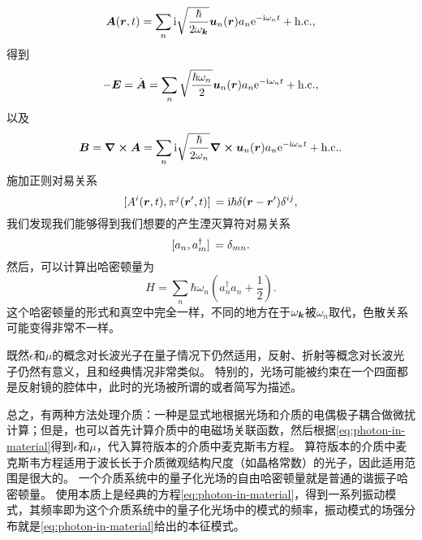 \begin{equation}
    \vb*{A}(\vb*{r}, t) = \sum_n \mathrm{i} \sqrt{\frac{\hbar}{2\omega_{\vb*{k}}}} \vb*{u}_n(\vb*{r}) a_n \mathrm{e}^{- \mathrm{i} \omega_n t} + \text{h.c.},
\end{equation}
得到
\begin{equation}
    - \vb*{E} = \dot{\vb*{A}} = \sum_n \sqrt{\frac{\hbar \omega_n}{2}} \vb*{u}_n(\vb*{r}) a_n \mathrm{e}^{-\mathrm{i} \omega_n t} + \text{h.c.},
\end{equation}
以及
\begin{equation}
    \vb*{B} = \curl{\vb*{A}} = \sum_n \mathrm{i} \sqrt{\frac{\hbar}{2\omega_n}} \curl{\vb*{u}_n(\vb*{r})} a_n \mathrm{e}^{-\mathrm{i} \omega_n t} + \text{h.c.}.
\end{equation}
施加正则对易关系
\begin{equation}
    \comm*{A^i(\vb*{r}, t)}{\pi^j(\vb*{r}', t)} = \ii \hbar \delta(\vb*{r} - \vb*{r}') \delta^{ij},
\end{equation}
我们发现我们能够得到我们想要的产生湮灭算符对易关系
\begin{equation}
    \comm*{a_n}{a_m^\dagger} = \delta_{mn}.
\end{equation}
然后，可以计算出哈密顿量为
\begin{equation}
    H = \sum_n \hbar \omega_n \left( a^\dagger_n a_n + \frac{1}{2} \right).
\end{equation}
这个哈密顿量的形式和真空中完全一样，不同的地方在于$\omega_{\vb*{k}}$被$\omega_n$取代，色散关系可能变得非常不一样。

既然$\epsilon$和$\mu$的概念对长波光子在量子情况下仍然适用，反射、折射等概念对长波光子仍然有意义，且和经典情况非常类似。
特别的，光场可能被约束在一个四面都是反射镜的腔体中，此时的光场被所谓的或者简写为描述。

总之，有两种方法处理介质：一种是显式地根据光场和介质的电偶极子耦合做微扰计算；但是，也可以首先计算介质中的电磁场关联函数，然后根据\eqref{eq:photon-in-material}得到$\epsilon$和$\mu$，代入算符版本的介质中麦克斯韦方程。
算符版本的介质中麦克斯韦方程适用于波长长于介质微观结构尺度（如晶格常数）的光子，因此适用范围是很大的。
一个介质系统中的量子化光场的自由哈密顿量就是普通的谐振子哈密顿量。
使用本质上是经典的方程\eqref{eq:photon-in-material}，得到一系列振动模式，其频率即为这个介质系统中的量子化光场中的模式的频率，振动模式的场强分布就是\eqref{eq:photon-in-material}给出的本征模式。

